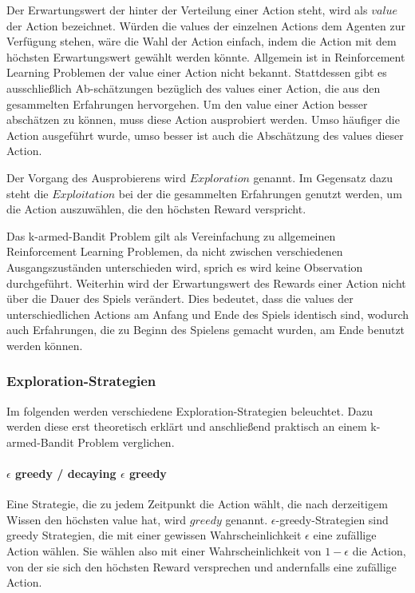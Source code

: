 \documentclass[11pt]{scrartcl}
\begin{document}
Der Erwartungswert der hinter der Verteilung einer Action steht, wird als $value$ der Action
bezeichnet. Würden die values der einzelnen Actions dem Agenten zur Verfügung stehen, wäre die 
Wahl der Action einfach, indem die Action mit dem höchsten Erwartungswert gewählt werden 
könnte. Allgemein ist in Reinforcement Learning Problemen der value einer Action nicht bekannt.
Stattdessen gibt es ausschließlich Ab-schätzungen bezüglich des values einer Action, die aus den
gesammelten Erfahrungen hervorgehen. Um den value einer Action besser abschätzen zu können,
muss diese Action ausprobiert werden. Umso häufiger die Action ausgeführt wurde, umso besser
ist auch die Abschätzung des values dieser Action.

Der Vorgang des Ausprobierens wird $Exploration$ genannt. Im Gegensatz dazu steht die
$Exploitation$ bei der die gesammelten Erfahrungen genutzt werden, um die Action
auszuwählen, die den höchsten Reward verspricht.

Das k-armed-Bandit Problem gilt als Vereinfachung zu allgemeinen Reinforcement Learning
Problemen, da nicht zwischen verschiedenen Ausgangszuständen unterschieden wird, sprich
es wird keine Observation durchgeführt. Weiterhin wird der Erwartungswert des
Rewards einer Action nicht über die Dauer des Spiels verändert. Dies bedeutet, dass die
values der unterschiedlichen Actions am Anfang und Ende des Spiels identisch sind, wodurch
auch Erfahrungen, die zu Beginn des Spielens gemacht wurden, am Ende benutzt werden
können.

\subsubsection{Exploration-Strategien}
Im folgenden werden verschiedene Exploration-Strategien beleuchtet. Dazu werden diese erst
theoretisch erklärt und anschließend praktisch an einem k-armed-Bandit Problem verglichen.

\paragraph{$\epsilon$ greedy / decaying $\epsilon$ greedy}
Eine Strategie, die zu jedem Zeitpunkt die Action wählt, die nach derzeitigem Wissen den
höchsten value hat, wird $greedy$ genannt. $\epsilon$-greedy-Strategien sind greedy
Strategien, die mit einer gewissen Wahrscheinlichkeit $\epsilon$ eine zufällige Action
wählen. Sie wählen also mit einer Wahrscheinlichkeit von $1 - \epsilon$ die Action, von
der sie sich den höchsten Reward versprechen und andernfalls eine zufällige Action.
\end{document}
